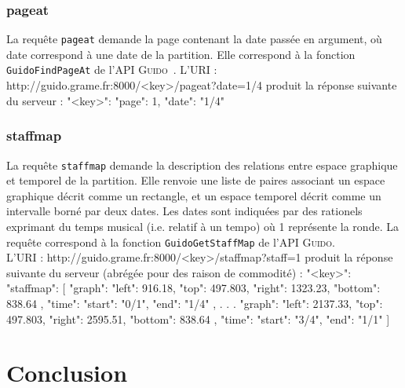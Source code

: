 \documentclass{article}
\newenvironment{code}		{\vspace{-2mm} \fontsize{8.5pt}{12pt}\selectfont \verbatim}{\endverbatim\vspace{-2mm}}
\newenvironment{mcode}		{\vspace{-2mm} \fontsize{10pt}{12pt}\selectfont \verbatim}{\endverbatim\vspace{-2mm}}
\newcommand{\guido}		{\textsc{Guido}}
\begin{document}
\subsubsection{pageat}
La requête \verb=pageat= demande la page contenant la date passée en argument, où \og{}date\fg{} correspond à une date de la partition. Elle correspond à la fonction \break \verb=GuidoFindPageAt= de l'API \guido\ . L'URI :
\begin{code}
 http://guido.grame.fr:8000/<key>/pageat?date=1/4
\end{code}
produit la réponse suivante du serveur :
\begin{mcode}
  {
    "<key>": {
      "page": 1,
      "date": "1/4"
    }
  }
\end{mcode}

\subsubsection{staffmap}\label{subsection:staffmap}
La requête \verb=staffmap= demande la description des relations entre espace graphique et temporel de la partition. Elle renvoie une liste de paires associant un espace graphique décrit comme un rectangle, et un espace temporel décrit comme un intervalle borné par deux dates. Les dates sont indiquées par des rationels exprimant du temps musical (i.e. relatif à un tempo) où 1 représente la ronde. La requête correspond à la fonction \verb=GuidoGetStaffMap= de l'API \guido. \\
L'URI :
\begin{code}
  http://guido.grame.fr:8000/<key>/staffmap?staff=1
\end{code}
produit la réponse suivante du serveur (abrégée pour des raison de commodité) :
\begin{mcode}
  {
    "<key>": {
      "staffmap": [
        {
          "graph": {
            "left": 916.18,
            "top": 497.803,
            "right": 1323.23,
            "bottom": 838.64
          },
          "time": {
            "start": "0/1",
            "end": "1/4"
          }
        },
        .
        .
        .
        {
          "graph": {
            "left": 2137.33,
            "top": 497.803,
            "right": 2595.51,
            "bottom": 838.64
          },
          "time": {
            "start": "3/4",
            "end": "1/1"
          }
        }
      ]
    }
  }
\end{mcode}

\section{Conclusion}
\end{document}

